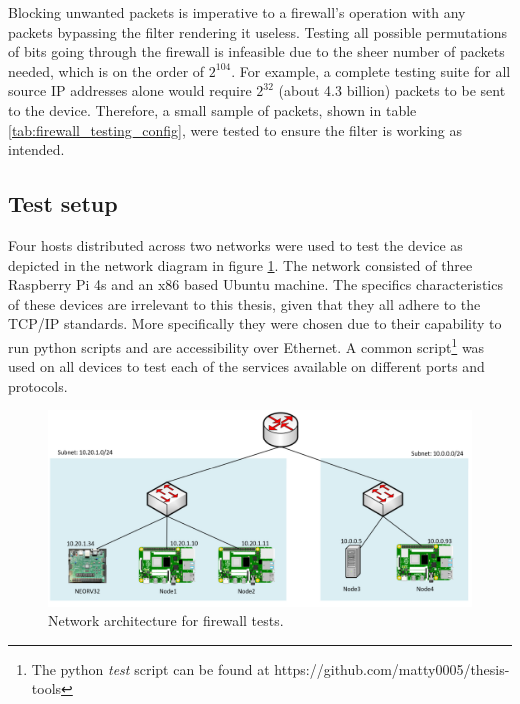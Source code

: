 Blocking unwanted packets is imperative to a firewall's operation with any packets bypassing the filter rendering it useless. Testing all possible permutations of bits going through the firewall is infeasible due to the sheer number of packets needed, which is on the order of $2^{104}$. For example, a complete testing suite for all source IP addresses alone would require $2^32$ (about 4.3 billion) packets to be sent to the device. Therefore, a small sample of packets, shown in table \ref{tab:firewall_testing_config}, were tested to ensure the filter is working as intended. 


\subsection{Test setup}

Four hosts distributed across two networks were used to test the device as depicted in the network diagram in figure \ref{fig:network_layout_test}. The network consisted of three Raspberry Pi 4s and an x86 based Ubuntu machine. The specifics characteristics of these devices are irrelevant to this thesis, given that they all adhere to the TCP/IP standards. More specifically they were chosen due to their capability to run python scripts and are accessibility over Ethernet. A common script\footnote[1]{The python \textit{test} script can be found at https://github.com/matty0005/thesis-tools} was used on all devices to test each of the services available on different ports and protocols. 



\begin{figure}[h]
    \centering
    \includegraphics[width=1\textwidth]{Images/NetworkArchitecture.png}
    \caption[Network architecture for firewall tests]{Network architecture for firewall tests.}
    \label{fig:network_layout_test}
\end{figure}


